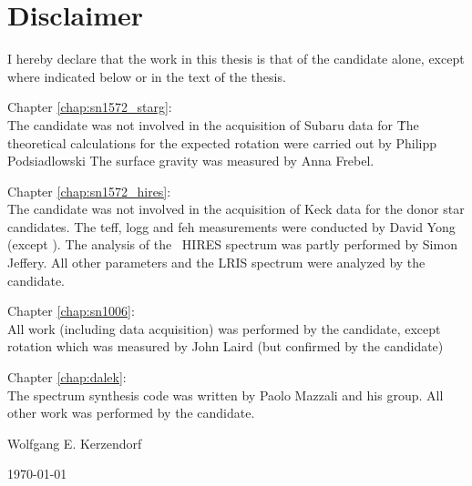 \section*{Disclaimer}

I hereby declare that the work in this thesis is that of the candidate
alone, except where indicated below or in the text of the thesis.

Chapter \ref{chap:sn1572_starg}:\\
The candidate was not involved in the acquisition of Subaru data for \starg\. 
The theoretical calculations for the expected rotation were carried out by Philipp Podsiadlowski
The surface gravity was measured by Anna Frebel.

Chapter \ref{chap:sn1572_hires}:\\
The candidate was not involved in the acquisition of Keck data for the donor star candidates.
The \gls{teff}, \gls{logg} and \gls{feh} measurements were conducted by David Yong (except \starb).
The analysis of the \starb\ HIRES spectrum was partly performed by Simon Jeffery. 
All other parameters and the LRIS spectrum were analyzed by the candidate.

Chapter \ref{chap:sn1006}:\\
All work (including data acquisition) was performed by the candidate, except rotation which was measured by John Laird (but confirmed by the candidate)

Chapter \ref{chap:dalek}:\\
The spectrum synthesis code was written by Paolo Mazzali and his group. 
All other work was performed by the candidate.



\vspace{3cm}
\begin{flushright}
Wolfgang E. Kerzendorf

\today
\end{flushright}

